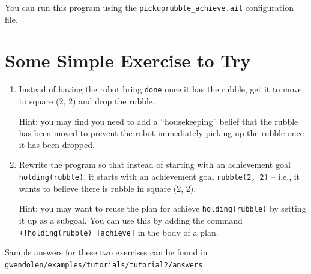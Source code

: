 \documentclass[a4]{article}
\begin{document}
You can run this program using the \lstinline{pickuprubble_achieve.ail} configuration file.

\section{Some Simple Exercise to Try}
\begin{enumerate}
\item Instead of having the robot bring \lstinline{done} once it has the rubble, get it to move to square (2, 2) and drop the rubble.  

Hint: you may find  you need to add a ``housekeeping'' belief that the rubble has been moved to prevent the robot immediately picking up the rubble once it has been dropped.
\item Rewrite the program so that instead of starting with an achievement goal \lstinline{holding(rubble)}, it starts with an achievement goal \lstinline{rubble(2, 2)} -- i.e., it wants to believe there is rubble in square (2, 2).

Hint: you may want to reuse the plan for achieve \lstinline{holding(rubble)} by setting it up as a subgoal.  You can use this by adding the command \lstinline{+!holding(rubble) [achieve]} in the body of a plan.
\end{enumerate}
\begin{sloppypar}
Sample answers for these two exercises can be found in \texttt{gwendolen/examples/tutorials/tutorial2/answers}.
\end{sloppypar}
\end{document}
